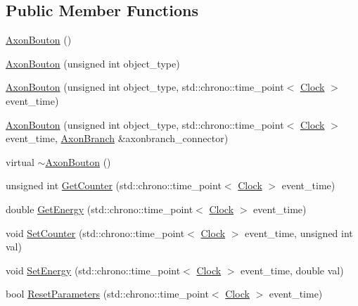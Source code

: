 \subsection*{Public Member Functions}
\begin{DoxyCompactItemize}
\item 
\mbox{\hyperlink{classAxonBouton_acd6521d65ecb2b86abf2e3a8b322699e}{Axon\+Bouton}} ()
\item 
\mbox{\hyperlink{classAxonBouton_a8a2da76b259a5ebab397fbd89d8b0632}{Axon\+Bouton}} (unsigned int object\+\_\+type)
\item 
\mbox{\hyperlink{classAxonBouton_a93e33d72d90801d29d2b16ef94b59fab}{Axon\+Bouton}} (unsigned int object\+\_\+type, std\+::chrono\+::time\+\_\+point$<$ \mbox{\hyperlink{universe_8h_a0ef8d951d1ca5ab3cfaf7ab4c7a6fd80}{Clock}} $>$ event\+\_\+time)
\item 
\mbox{\hyperlink{classAxonBouton_a6d671fc3b6bd8e617085c1bc7212400d}{Axon\+Bouton}} (unsigned int object\+\_\+type, std\+::chrono\+::time\+\_\+point$<$ \mbox{\hyperlink{universe_8h_a0ef8d951d1ca5ab3cfaf7ab4c7a6fd80}{Clock}} $>$ event\+\_\+time, \mbox{\hyperlink{classAxonBranch}{Axon\+Branch}} \&axonbranch\+\_\+connector)
\item 
virtual \mbox{\hyperlink{classAxonBouton_ab6f93f680d19d4f07476d1d1b3de776a}{$\sim$\+Axon\+Bouton}} ()
\item 
unsigned int \mbox{\hyperlink{classAxonBouton_a251fc23f754c077cf43ee68991b81624}{Get\+Counter}} (std\+::chrono\+::time\+\_\+point$<$ \mbox{\hyperlink{universe_8h_a0ef8d951d1ca5ab3cfaf7ab4c7a6fd80}{Clock}} $>$ event\+\_\+time)
\item 
double \mbox{\hyperlink{classAxonBouton_a8dff077a40565f4e3a34388a6c38a603}{Get\+Energy}} (std\+::chrono\+::time\+\_\+point$<$ \mbox{\hyperlink{universe_8h_a0ef8d951d1ca5ab3cfaf7ab4c7a6fd80}{Clock}} $>$ event\+\_\+time)
\item 
void \mbox{\hyperlink{classAxonBouton_afe285478d414f2815afb98abe7b92898}{Set\+Counter}} (std\+::chrono\+::time\+\_\+point$<$ \mbox{\hyperlink{universe_8h_a0ef8d951d1ca5ab3cfaf7ab4c7a6fd80}{Clock}} $>$ event\+\_\+time, unsigned int val)
\item 
void \mbox{\hyperlink{classAxonBouton_ab24fa467ab7221d0577e54734684a491}{Set\+Energy}} (std\+::chrono\+::time\+\_\+point$<$ \mbox{\hyperlink{universe_8h_a0ef8d951d1ca5ab3cfaf7ab4c7a6fd80}{Clock}} $>$ event\+\_\+time, double val)
\item 
bool \mbox{\hyperlink{classAxonBouton_a73d3721361c4e1ce6b110ffe1b4a7a88}{Reset\+Parameters}} (std\+::chrono\+::time\+\_\+point$<$ \mbox{\hyperlink{universe_8h_a0ef8d951d1ca5ab3cfaf7ab4c7a6fd80}{Clock}} $>$ event\+\_\+time)

\end{DoxyCompactItemize}
